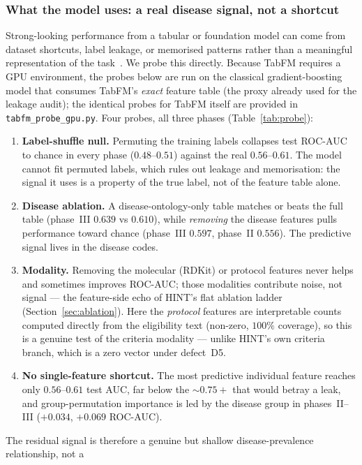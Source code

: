 \documentclass[a4paper,fleqn]{cas-sc}
\begin{document}
\subsubsection{What the model uses: a real disease signal, not a shortcut}
\label{sec:probe}
Strong-looking performance from a tabular or foundation model can come from dataset
shortcuts, label leakage, or memorised patterns rather than a meaningful representation of
the task~\citep{degrave2021ai,geirhos2020shortcut}. We probe this directly. Because TabFM
requires a GPU environment, the probes below are run on the classical gradient-boosting model
that consumes TabFM's \emph{exact} feature table (the proxy already used for the leakage
audit); the identical probes for TabFM itself are provided in \texttt{tabfm\_probe\_gpu.py}.
Four probes, all three phases (Table~\ref{tab:probe}):
\begin{enumerate}[leftmargin=1.4em,itemsep=1pt,topsep=2pt]
\item \textbf{Label-shuffle null.} Permuting the training labels collapses test ROC-AUC to
chance in every phase ($0.48$--$0.51$) against the real $0.56$--$0.61$. The model cannot fit
permuted labels, which rules out leakage and memorisation: the signal it uses is a property
of the true label, not of the feature table alone.
\item \textbf{Disease ablation.} A disease-ontology-only table matches or beats the full table
(phase~III $0.639$ vs $0.610$), while \emph{removing} the disease features pulls performance
toward chance (phase~III $0.597$, phase~II $0.556$). The predictive signal lives in the
disease codes.
\item \textbf{Modality.} Removing the molecular (RDKit) or protocol features never helps and
sometimes improves ROC-AUC; those modalities contribute noise, not signal --- the
feature-side echo of HINT's flat ablation ladder (Section~\ref{sec:ablation}). Here the
\emph{protocol} features are interpretable counts computed directly from the eligibility text
(non-zero, $100\%$ coverage), so this is a genuine test of the criteria modality --- unlike
HINT's own criteria branch, which is a zero vector under defect~D5.
\item \textbf{No single-feature shortcut.} The most predictive individual feature reaches only
$0.56$--$0.61$ test AUC, far below the $\sim0.75+$ that would betray a leak, and
group-permutation importance is led by the disease group in phases~II--III ($+0.034$,
$+0.069$ ROC-AUC).
\end{enumerate}
The residual signal is therefore a genuine but shallow disease-prevalence relationship, not a
\end{document}
